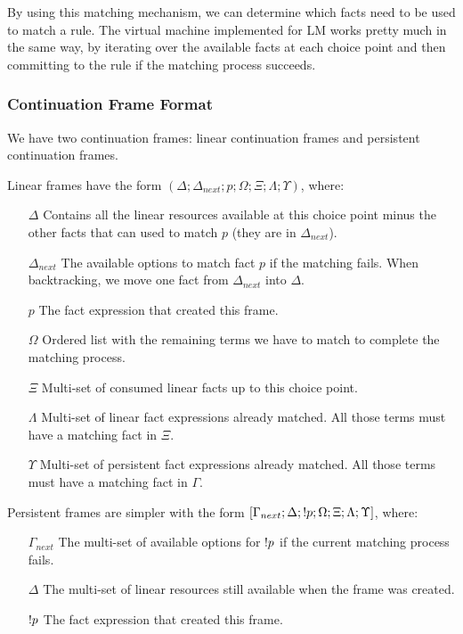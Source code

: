 By using this matching mechanism, we can determine which facts need to be used to match a rule.
The virtual machine implemented for LM works pretty much in the same way, by iterating over
the available facts at each choice point and then committing to the rule if the matching process
succeeds.

\subsubsection{Continuation Frame Format}

We have two continuation frames: linear continuation frames and persistent continuation frames.

Linear frames have the form $(\Delta; \Delta_{next}; p; \Omega; \Xi; \Lambda; \Upsilon)$, where:

\begin{enumerate}
   \item[$\Delta$] Contains all the linear resources available at this choice point minus the other facts that can used to match $p$ (they are in $\Delta_{next}$).
   \item[$\Delta_{next}$] The available options to match fact $p$ if the matching fails. When backtracking, we move one fact from $\Delta_{next}$ into $\Delta$.
   \item[$p$] The fact expression that created this frame.
   \item[$\Omega$] Ordered list with the remaining terms we have to match to complete the matching process.
   \item[$\Xi$] Multi-set of consumed linear facts up to this choice point.
   \item[$\Lambda$] Multi-set of linear fact expressions already matched. All those terms must have a matching fact in $\Xi$.
   \item[$\Upsilon$] Multi-set of persistent fact expressions already matched. All those terms must have a matching fact in $\Gamma$.
\end{enumerate}

Persistent frames are simpler with the form $[\Gamma_{next}; \Delta; {!} p; \Omega; \Xi; \Lambda; \Upsilon]$, where:

\begin{enumerate}
   \item[$\Gamma_{next}$] The multi-set of available options for ${!} p$ if the current matching process fails.
   \item[$\Delta$] The multi-set of linear resources still available when the frame was created.
   \item[${!} p$] The fact expression that created this frame.
\end{enumerate}

